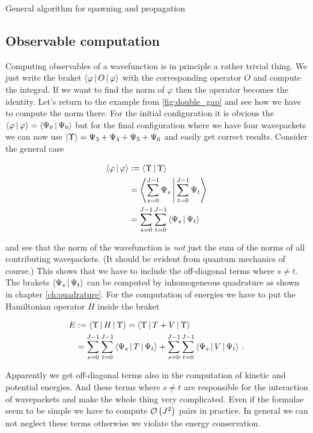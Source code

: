 \begin{chapter}{General algorithm for spawning and propagation}
\subsection{Observable computation}

Computing observables of a wavefunction is in principle a rather trivial thing.
We just write the braket $\Braket{\varphi|O|\varphi}$ with the corresponding
operator $O$ and compute the integral. If we want to find the norm of $\varphi$
then the operator becomes the identity. Let's return to the example from \ref{fig:double_gap}
and see how we have to compute the norm there. For the initial configuration it
is obvious the $\Braket{\varphi|\varphi} = \Braket{\Psi_0|\Psi_0}$ but for the
final configuration where we have four wavepackets we can now use $\Ket{\Upsilon} = \Psi_3 + \Psi_4 + \Psi_5 + \Psi_6$
and easily get correct results. Consider the general case

\begin{align}
  \Braket{\varphi|\varphi}
  & := \Braket{\Upsilon|\Upsilon} \\
  & = \Braket{\sum_{s=0}^{J-1} \Psi_s | \sum_{t=0}^{J-1} \Psi_t} \\
  & = \sum_{s=0}^{J-1} \sum_{t=0}^{J-1} \Braket{\Psi_s|\Psi_t}
\end{align}

and see that the norm of the wavefunction is \emph{not} just the sum of the norms
of all contributing wavepackets. (It should be evident from quantum mechanics
of course.) This shows that we have to include the off-diagonal terms where
$s \neq t$. The brakets $\Braket{\Psi_s|\Psi_t}$ can be computed by inhomogeneous
quadrature as shown in chapter \ref{ch:quadrature}. For the computation of energies
we have to put the Hamiltonian operator $H$ inside the braket

\begin{align}
  E & := \Braket{\Upsilon|H|\Upsilon} = \Braket{\Upsilon|T+V|\Upsilon} \\
  & = \sum_{s=0}^{J-1} \sum_{t=0}^{J-1} \Braket{\Psi_s|T|\Psi_t} + \sum_{s=0}^{J-1} \sum_{t=0}^{J-1} \Braket{\Psi_s|V|\Psi_t} \,.
\end{align}

Apparently we get off-diagonal terms also in the computation of kinetic and potential
energies. And these terms where $s\neq t$ are responsible for the interaction of
wavepackets and make the whole thing very complicated. Even if the formulae seem
to be simple we have to compute $\mathcal{O}\left( J^2 \right)$ pairs in practice. In general we can
not neglect these terms otherwise we violate the energy conservation.


\end{chapter}
